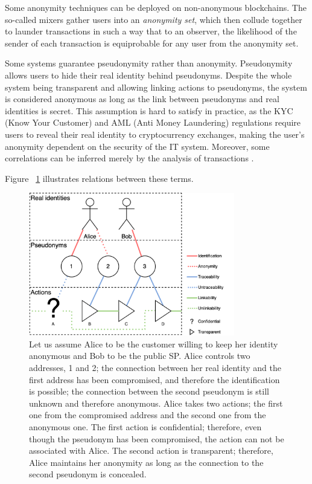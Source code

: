 Some anonymity techniques can be deployed on non-anonymous blockchains. The so-called mixers gather users into an \textit{anonymity set}, which then collude together to launder transactions in such a way that to an observer, the likelihood of the sender of each transaction is equiprobable for any user from the anonymity set.

Some systems guarantee pseudonymity rather than anonymity. Pseudonymity allows users to hide their real identity behind pseudonyms. Despite the whole system being transparent and allowing linking actions to pseudonyms, the system is considered anonymous as long as the link between pseudonyms and real identities is secret. This assumption is hard to satisfy in practice, as the KYC (Know Your Customer) and AML (Anti Money Laundering) regulations require users to reveal their real identity to cryptocurrency exchanges, making the user's anonymity dependent on the security of the IT system. Moreover, some correlations can be inferred merely by the analysis of transactions \cite{androulakiEvaluatingUserPrivacy2013, oberStructureAnonymityBitcoin2013}.

Figure ~\ref{fig:anonymity-diagram} illustrates relations between these terms.

\begin{figure}[h!]
\includegraphics[width=9cm]{anonymity-diagram.png}
\centering
\caption{Let us assume Alice to be the customer willing to keep her identity anonymous and Bob to be the public SP. Alice controls two addresses, 1 and 2; the connection between her real identity and the first address has been compromised, and therefore the identification is possible; the connection between the second pseudonym is still unknown and therefore anonymous. Alice takes two actions; the first one from the compromised address and the second one from the anonymous one. The first action is confidential; therefore, even though the pseudonym has been compromised, the action can not be associated with Alice. The second action is transparent; therefore, Alice maintains her anonymity as long as the connection to the second pseudonym is concealed.}

\label{fig:anonymity-diagram}
\end{figure}

